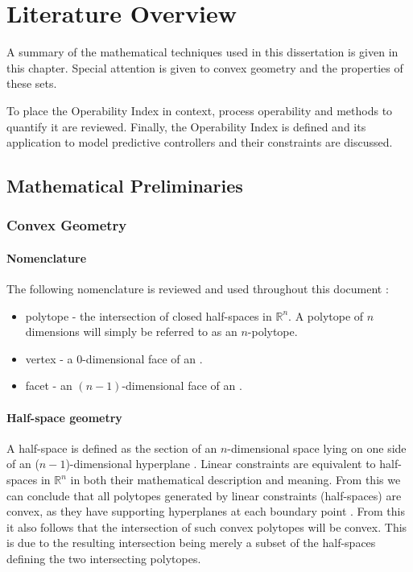\chapter{Literature Overview}\label{chap:lit}
\begin{overview}
  A summary of the mathematical techniques used in this dissertation is given in this chapter.
  Special attention is given to convex geometry and the properties of these sets.

  To place the Operability Index in context, process operability and methods to quantify it are reviewed.
  Finally, the Operability Index is defined and its application to model predictive controllers and their constraints are discussed.  
\end{overview}

\section{Mathematical Preliminaries}
\subsection{Convex Geometry}
\subsubsection{Nomenclature}
The following nomenclature is reviewed and used throughout this document \citep[487]{bayerlee}:
\begin{itemize}
\item polytope - the intersection of closed half-spaces in $\mathbb{R}^n$.
A polytope of $n$ dimensions will simply be referred to as an $n$-polytope.
\item vertex - a 0-dimensional face of an \npoly.
\item facet - an $(n-1)$-dimensional face of an \npoly.
\end{itemize}%
%

\subsubsection{Half-space geometry}\label{sec:hgeometry}
A half-space is defined as the section of an $n$-dimensional space lying on one side of an ($n-1$)-dimensional hyperplane \citep[1282]{crcmaths}.
Linear constraints are equivalent to half-spaces in $\mathbb{R}^n$ in both their mathematical description and meaning.
From this we can conclude that all polytopes generated by linear constraints (half-spaces) are convex, as they have supporting hyperplanes at each boundary point \citep[21]{manilev}.
From this it also follows that the intersection of such convex polytopes will be convex.
This is due to the resulting intersection being merely a subset of the half-spaces defining the two intersecting polytopes.


